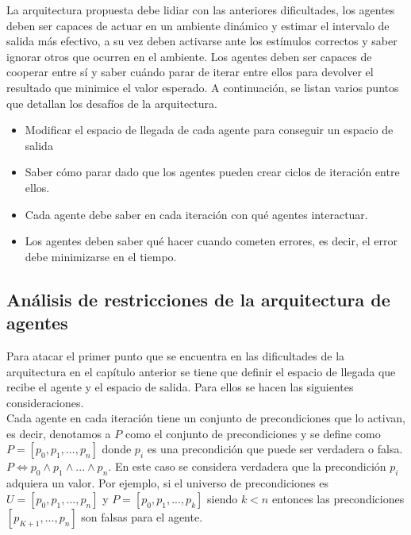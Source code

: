        La arquitectura propuesta debe lidiar con las anteriores dificultades, los agentes deben ser capaces de actuar en un ambiente dinámico y estimar el intervalo de salida más efectivo, a su vez deben activarse ante los estímulos correctos y saber ignorar otros que ocurren en el ambiente. Los agentes deben ser capaces de cooperar entre sí y saber cuándo parar de iterar entre ellos para devolver el resultado que minimice el valor esperado. A continuación, se listan varios puntos que detallan los desafíos de la arquitectura.\\
        \begin{itemize}

            \item Modificar el espacio de llegada de cada agente para conseguir un espacio de salida
            \item Saber cómo parar dado que los agentes pueden crear ciclos de iteración entre ellos.
            \item Cada agente debe saber en cada iteración con qué agentes interactuar.
            \item Los agentes deben saber qué hacer cuando cometen errores, es decir, el error debe minimizarse en el tiempo.\\

        \end{itemize}

\label{sec:15}

    \subsection*{ Análisis de restricciones de la arquitectura de agentes}

        Para atacar el primer punto que se encuentra en las dificultades de la arquitectura en el capítulo anterior se tiene que definir el espacio de llegada que recibe el agente y el espacio de salida. Para ellos se hacen las siguientes consideraciones.\\

        Cada agente en cada iteración tiene un conjunto de precondiciones que lo activan, es decir, denotamos a $P$ como el conjunto de precondiciones y se define como $P=[ p_0,p_1,...,p_n]$ donde $p_i$ es una precondición que puede ser verdadera o falsa. $P \iff p_0 \land p_1 \land...\land p_n$. En este caso se considera verdadera que la precondición $p_i$ adquiera un valor. Por ejemplo, si el universo de precondiciones es $U=[p_0,p_1,...,p_n]$ y $P=[p_0,p_1,...,p_k]$ siendo $k<n$ entonces las precondiciones $[p_{K+1},...,p_n]$ son falsas para el agente. \\


